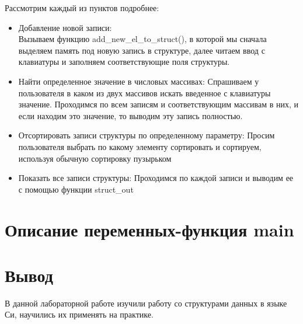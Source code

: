 \documentclass[a4paper,12pt]{report}
\begin{document}
Рассмотрим каждый из пунктов подробнее:\\
\begin{itemize}
    \item Добавление новой записи:\\
        Вызываем функцию add_new_el_to_struct(), в которой мы сначала выделяем память под новую запись в структуре, далее читаем ввод с клавиатуры и заполняем соответствующие поля структуры.
    \item Найти определенное значение в числовых массивах:
        Спрашиваем у пользователя в каком из двух массивов искать введенное с клавиатуры значение. Проходимся по всем записям и соответствующим массивам в них, и если находим это значение, то выводим эту запись полностью.
    \item Отсортировать записи структуры по определенному параметру:
        Просим пользователя выбрать по какому элементу сортировать и сортируем, используя обычную сортировку пузырьком
    \item Показать все записи структуры:
        Проходимся по каждой записи и выводим ее с помощью функции struct_out
\end{itemize}


\section*{Описание переменных-функция main}
\begin{centering}
\end{centering}

\newpage

\section*{Вывод}
В данной лабораторной работе изучили работу со структурами данных в языке Си, научились их применять на практике.
\end{document}
